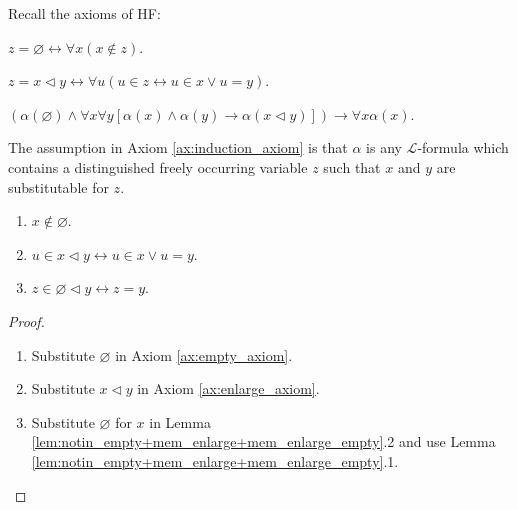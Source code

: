 Recall the axioms of HF:

\begin{axiom}
    \label{ax:empty_axiom}
    \leanok
    $z=\varnothing \leftrightarrow \forall x(x \notin z)$.
\end {axiom}

\begin{axiom}
    \label{ax:enlarge_axiom}
    \leanok
    $z=x \lhd y \leftrightarrow \forall u(u \in z \leftrightarrow u \in x \lor u=y)$.
\end {axiom}

\begin{axiom}
    \label{ax:induction_axiom}
    \leanok
    $(\alpha(\varnothing) \land \forall x \forall y[\alpha(x) \land \alpha(y) \rightarrow 
    \alpha(x \lhd y)]) \rightarrow \forall x \alpha(x)$. 
\end {axiom}

The assumption in Axiom \ref{ax:induction_axiom} is that 
$\alpha$ is any $\mathcal{L}$-formula which contains a 
distinguished freely occurring variable $z$ such that $x$ and $y$ are substitutable for $z$.

\begin{lemma}
    \label{lem:notin_empty+mem_enlarge+mem_enlarge_empty}
    \leanok
    \leavevmode
    \begin{enumerate}
        \item $x\notin \varnothing$.
        \item $u \in x \lhd y \leftrightarrow u \in x \lor u=y$.
        \item $z\in \varnothing \lhd y \leftrightarrow z = y$.
    \end{enumerate}
\end{lemma}

\begin{proof}
    \leanok
    \leavevmode
    \begin{enumerate}
        \item Substitute $\varnothing$ in Axiom \ref{ax:empty_axiom}.
        \item Substitute $x \lhd y$ in Axiom \ref{ax:enlarge_axiom}.
        \item Substitute $\varnothing$ for $x$ in Lemma 
        \ref{lem:notin_empty+mem_enlarge+mem_enlarge_empty}.2 and use Lemma 
        \ref{lem:notin_empty+mem_enlarge+mem_enlarge_empty}.1.
    \end{enumerate}
\end{proof}


